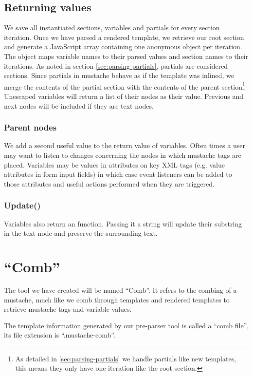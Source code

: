 \documentclass[thesis.tex]{subfiles}
\begin{document}
\subsection{Returning values}
We save all instantiated sections, variables and partials for every section
iteration. Once we have parsed a rendered template, we retrieve our root section
and generate a JavaScript array containing one anonymous object per iteration.
The object maps variable names to their parsed values and section names to their
iterations.
As noted in section \ref{sec:parsing-partials}, partials are considered
sections. Since partials in mustache behave as if the template was inlined,
we merge the contents of the partial section with the contents of the
parent section\footnote{
	As detailed in \ref{sec:parsing-partials} we handle partials like new
	templates, this means they only have one iteration like the root section.
}
Unescaped variables will return a list of their nodes as their value.
Previous and next nodes will be included if they are text nodes.

\subsubsection{Parent nodes}
We add a second useful value to the return value of variables. Often times a
user may want to listen to changes concerning the nodes in which mustache tags
are placed. Variables may be values in attributes on key XML tags
(e.g. value attributes in form input fields) in which case event listeners can
be added to those attributes and useful actions performed when they are
triggered.

\subsubsection{Update()}
Variables also return an  function. Passing it a string
will update their substring in the text node and preserve the surrounding text.

\section{``Comb''}
The tool we have created will be named ``Comb''. It refers to the combing of
a mustache, much like we comb through templates and rendered templates to
retrieve mustache tags and variable values.

The template information generated by our pre-parser tool is called a
``comb file'', its file extension is ``.mustache-comb''.
\end{document}
